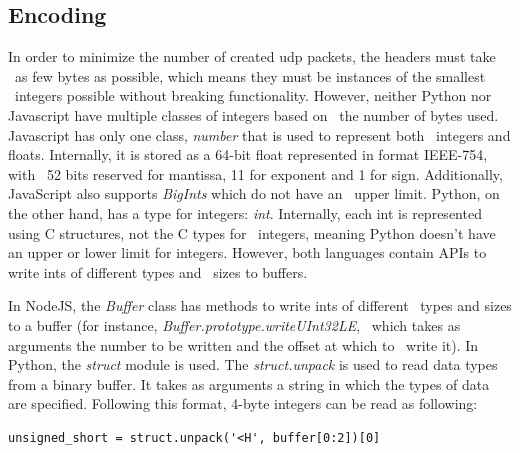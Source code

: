 \subsection{Encoding}
\label{subsec:udp-packer-encoding}
In order to minimize the number of created udp packets, the headers must take \
as few bytes as possible, which means they must be instances of the smallest \
integers possible without breaking functionality.
However, neither Python nor Javascript have multiple classes of integers based on \
the number of bytes used.
Javascript has only one class, \textit{number} that is used to represent both \
integers and floats.
Internally, it is stored as a 64-bit float represented in format IEEE-754, with \
52 bits reserved for mantissa, 11 for exponent and 1 for sign.
Additionally, JavaScript also supports \textit{BigInts} which do not have an \
upper limit.
Python, on the other hand, has a type for integers: \textit{int}.
Internally, each int is represented using C structures, not the C types for \
integers, meaning Python doesn't have an upper or lower limit for integers.
However, both languages contain APIs to write ints of different types and \
sizes to buffers.

In NodeJS, the \textit{Buffer} class has methods to write ints of different \
types and sizes to a buffer (for instance, \textit{Buffer.prototype.writeUInt32LE}, \
which takes as arguments the number to be written and the offset at which to \
write it).
In Python, the \textit{struct} module is used.
The \textit{struct.unpack} is used to read data types from a binary buffer.
It takes as arguments a string in which the types of data are specified.
Following this format, 4-byte integers can be read as following:
\begin{verbatim}
unsigned_short = struct.unpack('<H', buffer[0:2])[0]
\end{verbatim}

